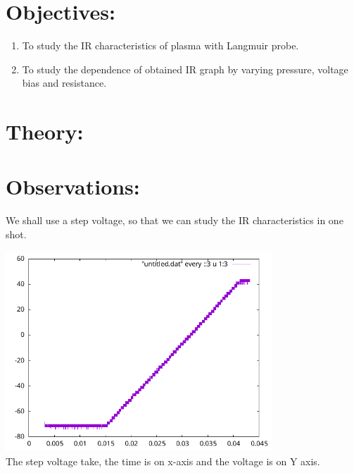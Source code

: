 \documentclass[]{report}[12 pt]
\begin{document}
	

\section*{Objectives:}
\begin{enumerate}
	\item To study the IR characteristics of plasma with Langmuir probe.
	\item To study the dependence of obtained IR graph by varying pressure, voltage bias and resistance.
\end{enumerate}

\section*{Theory:}

\section*{Observations:}
We shall use a step voltage, so that we can study the IR characteristics in one shot.

\begin{center}
	\includegraphics[width=10cm]{voltage}\\
	The step voltage take, the time is on x-axis and the voltage is on Y axis.
\end{center}
\end{document}
